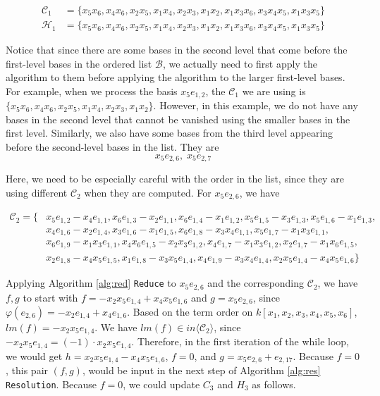 \documentclass{article}
\theoremstyle{definition}
\theoremstyle{remark}
\theoremstyle{example}
\begin{document}
\begin{align}
        \mathcal{C}_1 &= \{x_5x_6,x_4x_6,x_2x_5,x_1x_4,x_2x_3,x_1x_2,x_1x_3x_6,x_3x_4x_5,x_1x_3x_5\}\\
        \mathcal{H}_1 &= \{x_5x_6,x_4x_6,x_2x_5,x_1x_4,x_2x_3,x_1x_2,x_1x_3x_6,x_3x_4x_5,x_1x_3x_5\}
\end{align}

Notice that since there are some bases in the second level that come before the first-level bases in the ordered list $\mathcal{B}$, we actually need to first apply the algorithm to them before applying the algorithm to the larger first-level bases. For example, when we process the basis $x_5e_{1,2}$, the $\mathcal{C}_1$ we are using is $\{x_5x_6,x_4x_6,x_2x_5,x_1x_4,x_2x_3,x_1x_2\}$. However, in this example, we do not have any bases in the second level that cannot be vanished using the smaller bases in the first level. Similarly, we also have some bases from the third level appearing before the second-level bases in the list. They are 
\begin{equation}
    x_5e_{2,6},\;x_5e_{2,7}
\end{equation}

Here, we need to be especially careful with the order in the list, since they are using different $\mathcal{C}_2$ when they are computed. For $x_5e_{2,6}$, we have

\begin{equation}
    \begin{aligned}
        \mathcal{C}_2 = \{&x_5e_{1,2}-x_4e_{1,1},x_6e_{1,3}-x_2e_{1,1},x_6e_{1,4}-x_1e_{1,2},x_5e_{1,5}-x_3e_{1,3},x_5e_{1,6}-x_1e_{1,3},\\
        & x_4e_{1,6}-x_2e_{1,4},x_3e_{1,6}-x_1e_{1,5},x_6e_{1,8}-x_3x_4e_{1,1},x_5e_{1,7}-x_1x_3e_{1,1},\\
        & x_6e_{1,9}-x_1x_3e_{1,1},x_4x_6e_{1,5}-x_2x_3e_{1,2},x_4e_{1,7}-x_1x_3e_{1,2},x_2e_{1,7}-x_1x_6e_{1,5},\\
        & x_2e_{1,8}-x_4x_5e_{1,5},x_1e_{1,8}-x_3x_5e_{1,4},x_4e_{1,9}-x_3x_4e_{1,4},x_2x_5e_{1,4}-x_4x_5e_{1,6}\}
    \end{aligned}
\end{equation}

Applying Algorithm \ref{alg:red} \verb+Reduce+ to $x_5e_{2,6}$ and the corresponding $\mathcal{C}_2$, we have $f,g$ to start with $f = -x_2x_5e_{1,4} + x_4x_5e_{1,6}$ and $g = x_5e_{2,6}$, since $\varphi(e_{2,6}) = -x_2e_{1,4}+x_4e_{1,6}$. Based on the term order on $k[x_1,x_2,x_3,x_4,x_5,x_6]$, $lm(f) = -x_2x_5e_{1,4}$. We have $lm(f) \in in\langle \mathcal{C}_2\rangle$, since $-x_2x_5e_{1,4} = (-1) \cdot x_2x_5e_{1,4}$. Therefore, in the first iteration of the while loop, we would get $h = x_2x_5e_{1,4}-x_4x_5e_{1,6}$, $f = 0$, and $g = x_5e_{2,6}+e_{2,17}$. Because $f = 0$, this pair $(f,g)$, would be input in the next step of Algorithm \ref{alg:res} \verb+Resolution+. Because $f = 0$, we could update $C_3$ and $H_3$ as follows.
\end{document}
